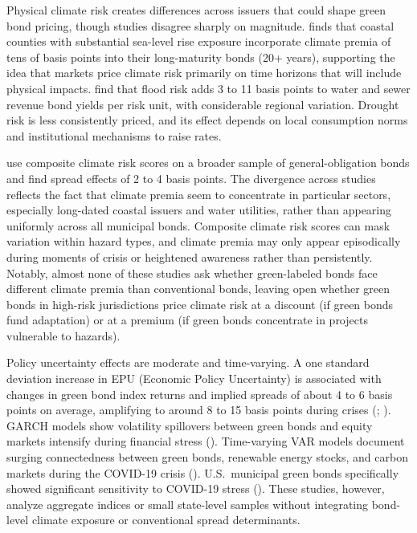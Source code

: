 \documentclass[
  11pt,
]{article}
\makeatletter
\renewcommand{\subsection}{\@startsection{subsection}{2}{\z@}{-1.6ex\@plus -0.5ex \@minus -.2ex}{0.6ex \@plus.2ex}{\normalfont\large\bfseries\color{TitleBlue}}}
\makeatother
\begin{document}
Physical climate risk creates differences across issuers that could shape green bond pricing, though studies disagree sharply on magnitude.  finds that coastal counties with substantial sea-level rise exposure incorporate climate premia of tens of basis points into their long-maturity bonds (20+ years), supporting the idea that markets price climate risk primarily on time horizons that will include physical impacts.  find that flood risk adds 3 to 11 basis points to water and sewer revenue bond yields per risk unit, with considerable regional variation. Drought risk is less consistently priced, and its effect depends on local consumption norms and institutional mechanisms to raise rates.

 use composite climate risk scores on a broader sample of general-obligation bonds and find spread effects of 2 to 4 basis points. The divergence across studies reflects the fact that climate premia seem to concentrate in particular sectors, especially long-dated coastal issuers and water utilities, rather than appearing uniformly across all municipal bonds. Composite climate risk scores can mask variation within hazard types, and climate premia may only appear episodically during moments of crisis or heightened awareness rather than persistently. Notably, almost none of these studies ask whether green-labeled bonds face different climate premia than conventional bonds, leaving open whether green bonds in high-risk jurisdictions price climate risk at a discount (if green bonds fund adaptation) or at a premium (if green bonds concentrate in projects vulnerable to hazards).

\subsection{Policy uncertainty and time-series dynamics}

Policy uncertainty effects are moderate and time-varying. A one standard deviation increase in EPU (Economic Policy Uncertainty) is associated with changes in green bond index returns and implied spreads of about 4 to 6 basis points on average, amplifying to around 8 to 15 basis points during crises (; ). GARCH models show volatility spillovers between green bonds and equity markets intensify during financial stress (). Time-varying VAR models document surging connectedness between green bonds, renewable energy stocks, and carbon markets during the COVID-19 crisis (). U.S.\ municipal green bonds specifically showed significant sensitivity to COVID-19 stress (). These studies, however, analyze aggregate indices or small state-level samples without integrating bond-level climate exposure or conventional spread determinants.
\end{document}
